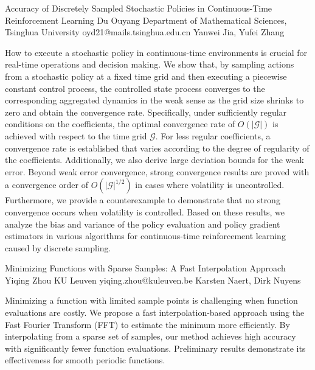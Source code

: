 \begin{talk}
  {Accuracy of Discretely Sampled Stochastic Policies in Continuous-Time Reinforcement Learning}%
  {Du Ouyang}%
  {Department of Mathematical Sciences, Tsinghua University}%
  {oyd21@mails.tsinghua.edu.cn}%
  {Yanwei Jia, Yufei Zhang}%
  
    
   


\medskip

How to execute a stochastic policy in continuous-time environments is crucial for real-time operations and decision making. We show that, by sampling actions from a stochastic policy at a fixed time grid and then executing a piecewise constant control process, the controlled state process converges to the corresponding aggregated dynamics in the weak sense as the grid size shrinks to zero and obtain the convergence rate. Specifically, under sufficiently regular conditions on the coefficients, the optimal convergence rate of $O(|\mathscr{G}|)$ is achieved with respect to the time grid $\mathscr{G}$. For less regular coefficients, a convergence rate is established that varies according to the degree of regularity of the coefficients. Additionally, we also derive large deviation bounds for the weak error. Beyond weak error convergence, strong convergence results are proved with a convergence order of $O(|\mathscr{G}|^{1/2})$ in cases where volatility is uncontrolled. Furthermore, we provide a counterexample to demonstrate that no strong convergence occurs when volatility is controlled. Based on these results, we analyze the bias and variance of the policy evaluation and policy gradient estimators in various algorithms for continuous-time reinforcement learning caused by discrete sampling.


\end{talk}

\begin{talk}
  {Minimizing Functions with Sparse Samples: A Fast Interpolation Approach
}%
  {Yiqing Zhou}%
  {KU Leuven}%
  {yiqing.zhou@kuleuven.be}%
  {Karsten Naert, Dirk Nuyens}%
  
    
   
Minimizing a function with limited sample points is challenging when function evaluations are costly. We propose a fast interpolation-based approach using the Fast Fourier Transform (FFT) to estimate the minimum more efficiently. By interpolating from a sparse set of samples, our method achieves high accuracy with significantly fewer function evaluations. Preliminary results demonstrate its effectiveness for smooth periodic functions.
\end{talk}

